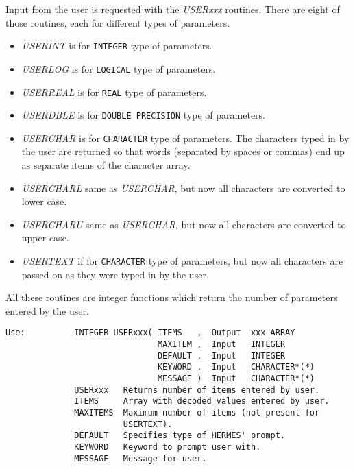 Input from the user is requested with the {\sl USERxxx\/} routines.
There are eight of those routines, each for different types of parameters.

\begin{itemize}

\item {\sl USERINT\/} is for {\tt INTEGER} type of
parameters.

\item {\sl USERLOG\/} is for {\tt LOGICAL} type of
parameters.

\item {\sl USERREAL\/} is for {\tt REAL} type of
parameters.

\item {\sl USERDBLE\/} is for {\tt DOUBLE PRECISION}
type of parameters.

\item {\sl USERCHAR\/} is for {\tt CHARACTER} type of
parameters.  The characters typed in by the user are returned so that
words (separated by spaces or commas) end up as separate items of the
character array.

\item {\sl USERCHARL\/} same as {\sl USERCHAR}, but now
all characters are converted to lower case.

\item {\sl USERCHARU\/} same as {\sl USERCHAR}, but now
all characters are converted to upper case.

\item {\sl USERTEXT\/} if for {\tt CHARACTER} type of
parameters, but now all characters are passed on as they were typed in
by the user.

\end{itemize}

\noindent All these routines are integer functions which return the
number of parameters entered by the user.

\begin{verbatim}
Use:          INTEGER USERxxx( ITEMS   ,  Output  xxx ARRAY
                               MAXITEM ,  Input   INTEGER
                               DEFAULT ,  Input   INTEGER
                               KEYWORD ,  Input   CHARACTER*(*)
                               MESSAGE )  Input   CHARACTER*(*)
              USERxxx   Returns number of items entered by user.
              ITEMS     Array with decoded values entered by user.
              MAXITEMS  Maximum number of items (not present for
                        USERTEXT).
              DEFAULT   Specifies type of HERMES' prompt.
              KEYWORD   Keyword to prompt user with.
              MESSAGE   Message for user.
\end{verbatim}

